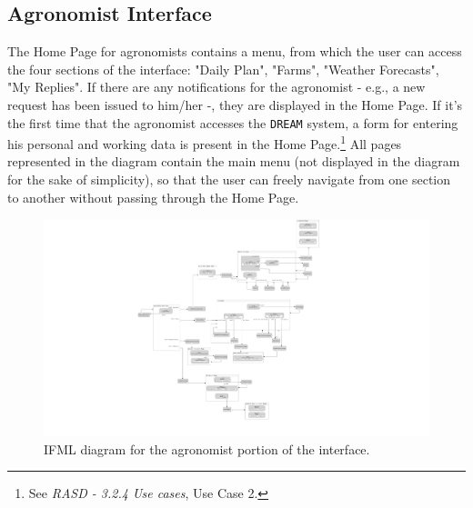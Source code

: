 \documentclass{article}
\begin{document}
\subsection{Agronomist Interface}
The Home Page for agronomists contains a menu, from which the user can access the four sections of the interface: "Daily Plan", "Farms", "Weather Forecasts", "My Replies". \newline
If there are any notifications for the agronomist - e.g., a new request has been issued to him/her -, they are displayed in the Home Page.\newline
If it's the first time that the agronomist accesses the \verb|DREAM| system, a form for entering his personal and working data is present in the Home Page.\footnote{See \textit{RASD - 3.2.4 Use cases}, Use Case 2.}\newline
All pages represented in the diagram contain the main menu (not displayed in the diagram for the sake of simplicity), so that the user can freely navigate from one section to another without passing through the Home Page. 
\begin{center}
    \begin{figure}
    \includegraphics[scale=0.07]{diagrams/ui diagrams/agronomist/agronomist.png}
    \caption{IFML diagram for the agronomist portion of the interface.}
\end{figure}
\end{center}
\end{document}
